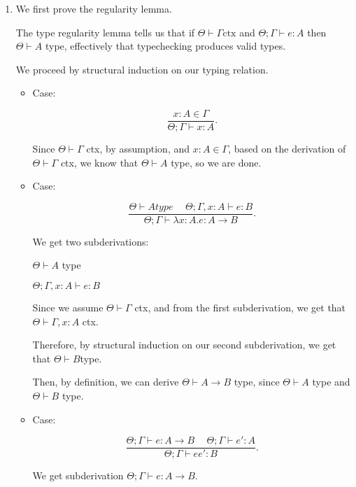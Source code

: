 


\begin{enumerate}
  \item
    We first prove the regularity lemma.

    The type regularity lemma tells us that if $\Theta \vdash \Gamma \text{ctx}$ and $\Theta;\Gamma \vdash e : A$ then $\Theta \vdash A$ type, effectively that typechecking produces valid types.

    We proceed by structural induction on our typing relation.

    \begin{itemize}
      \item
        Case:

        \[
          \frac{x : A \in \Gamma}{\Theta;\Gamma \vdash x : A}
        .\] 

        Since $\Theta \vdash \Gamma$ ctx, by assumption, and $x : A \in \Gamma$, based on the derivation of $\Theta \vdash \Gamma$ ctx, we know that $\Theta \vdash A$ type, so we are done.

      \item
        Case:

        \[
          \frac{\Theta \vdash A type \hspace{15pt} \Theta;\Gamma, x : A \vdash e : B}{\Theta;\Gamma \vdash \lambda x :A. e : A \rightarrow B}
        .\] 

        We get two subderivations:

        $\Theta \vdash A$ type

        $\Theta;\Gamma,x : A \vdash e : B$

        Since we assume $\Theta \vdash \Gamma$ ctx, and from the first subderivation, we get that $\Theta \vdash \Gamma, x : A$ ctx.

        Therefore, by structural induction on our second subderivation, we get that $\Theta \vdash B $type.

        Then, by definition, we can derive $\Theta \vdash A \rightarrow B$ type, since $\Theta \vdash A$ type and $\Theta \vdash B$ type.

      \item
        Case:

        \[
          \frac{\Theta;\Gamma \vdash e : A \rightarrow B \hspace{15pt} \Theta;\Gamma \vdash e'  :A}{\Theta;\Gamma \vdash e e' : B}
        .\] 

        We get subderivation $\Theta;\Gamma \vdash e : A \rightarrow B$.


\end{itemize}
\end{enumerate}
